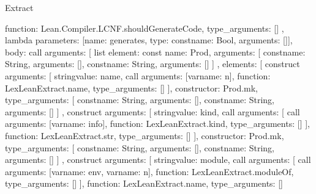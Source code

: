 \begin{lexlean}{Extract}
\begin{toolingmodule}
{{{{            function: Lean.Compiler.LCNF.shouldGenerateCode,
            type_arguments: []
          },
          lambda{
            parameters: [{name: generates, type: const{name: Bool, arguments: []}}],
            body: call{
              arguments: [
                list{
                  element: const{
                    name: Prod,
                    arguments: [
                      const{name: String, arguments: []},
                      const{name: String, arguments: []}
                    ]
                  },
                  elements: [
                    construct{
                      arguments: [
                        string{value: name},
                        call{
                          arguments: [var{name: n}],
                          function: LexLeanExtract.name,
                          type_arguments: []
                        }
                      ],
                      constructor: Prod.mk,
                      type_arguments: [
                        const{name: String, arguments: []},
                        const{name: String, arguments: []}
                      ]
                    },
                    construct{
                      arguments: [
                        string{value: kind},
                        call{
                          arguments: [
                            call{
                              arguments: [var{name: info}],
                              function: LexLeanExtract.kind,
                              type_arguments: []
                            }
                          ],
                          function: LexLeanExtract.str,
                          type_arguments: []
                        }
                      ],
                      constructor: Prod.mk,
                      type_arguments: [
                        const{name: String, arguments: []},
                        const{name: String, arguments: []}
                      ]
                    },
                    construct{
                      arguments: [
                        string{value: module},
                        call{
                          arguments: [
                            call{
                              arguments: [var{name: env}, var{name: n}],
                              function: LexLeanExtract.moduleOf,
                              type_arguments: []
                            }
                          ],
                          function: LexLeanExtract.name,
                          type_arguments: []
                        }
}}}}}}}
\end{toolingmodule}
\end{lexlean}
